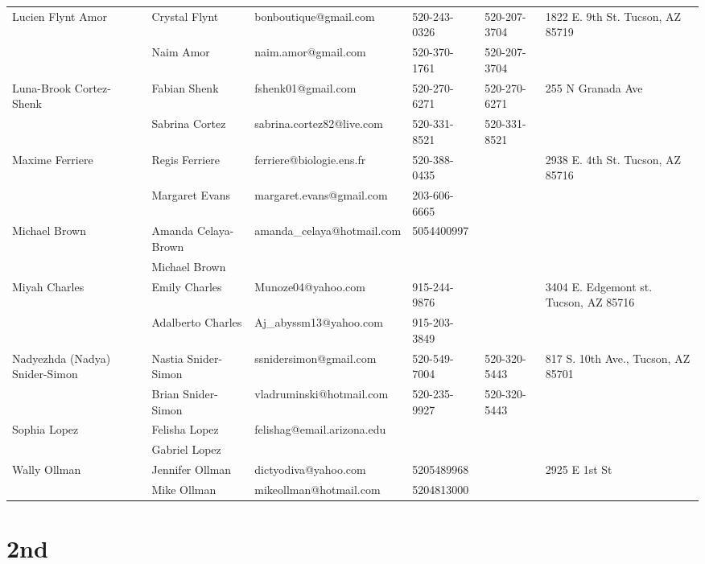 \documentclass[landscape]{article}\usepackage[]{graphicx}\usepackage[]{color}
\begin{document}
\begin{longtable}{|p{100pt}|p{100pt}|p{140pt}|p{60pt}|p{64pt}|p{120pt}|}
\hline
\multirow{2}{100pt}{Lucien Flynt Amor} & Crystal Flynt & bonboutique@gmail.com & 520-243-0326 & 520-207-3704 & \multirow{2}{120pt}{1822 E. 9th St. Tucson, AZ 85719} \\
 & Naim Amor & naim.amor@gmail.com & 520-370-1761 & 520-207-3704 & \\
\hline
\multirow{2}{100pt}{Luna-Brook Cortez-Shenk} & Fabian Shenk & fshenk01@gmail.com & 520-270-6271 & 520-270-6271 & \multirow{2}{120pt}{255 N Granada Ave} \\
 & Sabrina Cortez & sabrina.cortez82@live.com & 520-331-8521 & 520-331-8521 & \\
\hline
\multirow{2}{100pt}{Maxime Ferriere} & Regis Ferriere & ferriere@biologie.ens.fr & 520-388-0435 &  & \multirow{2}{120pt}{2938 E. 4th St. Tucson, AZ 85716} \\
 & Margaret Evans & margaret.evans@gmail.com & 203-606-6665 &  & \\
\hline
\multirow{2}{100pt}{Michael Brown} & Amanda Celaya-Brown & amanda\_celaya@hotmail.com & 5054400997 &  & \multirow{2}{120pt}{} \\
 & Michael Brown &  &  &  & \\
\hline
\multirow{2}{100pt}{Miyah Charles} & Emily Charles & Munoze04@yahoo.com & 915-244-9876 &  & \multirow{2}{120pt}{3404 E. Edgemont st. Tucson, AZ 85716} \\
 & Adalberto Charles & Aj\_abyssm13@yahoo.com & 915-203-3849 &  & \\
\hline
\multirow{2}{100pt}{Nadyezhda (Nadya) Snider-Simon} & Nastia Snider-Simon & ssnidersimon@gmail.com & 520-549-7004 & 520-320-5443 & \multirow{2}{120pt}{817 S. 10th Ave., Tucson, AZ 85701} \\
 & Brian Snider-Simon & vladruminski@hotmail.com & 520-235-9927 & 520-320-5443 & \\
\hline
\multirow{2}{100pt}{Sophia Lopez} & Felisha Lopez & felishag@email.arizona.edu &  &  & \multirow{2}{120pt}{} \\
 & Gabriel Lopez &  &  &  & \\
\hline
\multirow{2}{100pt}{Wally Ollman} & Jennifer Ollman & dictyodiva@yahoo.com & 5205489968 &  & \multirow{2}{120pt}{2925 E 1st St} \\
 & Mike Ollman & mikeollman@hotmail.com & 5204813000 &  & \\
\hline
\end{longtable}
\newpage
\section{2nd}
\end{document}
